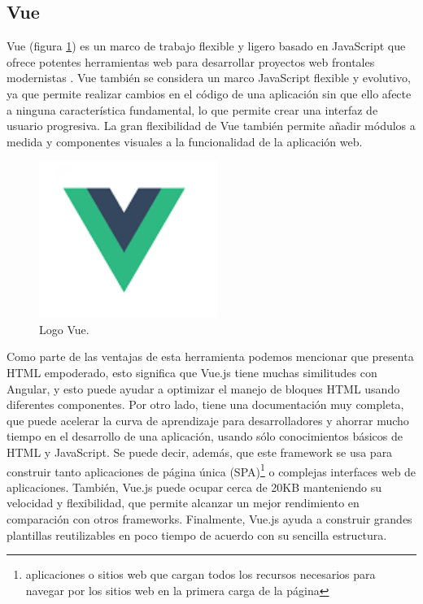 \subsection{Vue}
Vue (figura \ref{vue}) es un marco de trabajo flexible y ligero basado en JavaScript que ofrece potentes herramientas web para desarrollar proyectos web frontales modernistas \cite{vue}. Vue tambi\'en se considera un marco JavaScript flexible y evolutivo, ya que permite realizar cambios en el c\'odigo de una aplicaci\'on sin que ello afecte a ninguna caracter\'istica fundamental, lo que permite crear una interfaz de usuario progresiva. La gran flexibilidad de Vue tambi\'en permite a\~nadir m\'odulos a medida y componentes visuales a la funcionalidad de la aplicaci\'on web.

\begin{figure}
\vspace{-20pt}
\begin{center}
\includegraphics[width=0.52\textwidth]{images/vueLogo.png} 
\end{center} \vspace{-20pt} \caption{Logo Vue.}  \label{vue} \vspace{-10pt} 
\end{figure}

Como parte de las ventajas de esta herramienta podemos mencionar que presenta HTML empoderado, esto significa que Vue.js tiene muchas similitudes con Angular, y esto puede ayudar a optimizar el manejo de bloques HTML usando diferentes componentes. Por otro lado, tiene una documentaci\'on muy completa, que puede acelerar la curva de aprendizaje para desarrolladores y ahorrar mucho tiempo en el desarrollo de una aplicaci\'on, usando s\'olo conocimientos b\'asicos de HTML y JavaScript. Se puede decir, adem\'as, que este framework se usa para construir tanto aplicaciones de p\'agina \'unica (SPA)\footnote{aplicaciones o sitios web que cargan todos los recursos necesarios para navegar por los sitios web en la primera carga de la p\'agina} o complejas interfaces web de aplicaciones. Tambi\'en, Vue.js puede ocupar cerca de 20KB manteniendo su velocidad y flexibilidad, que permite alcanzar un mejor rendimiento en comparaci\'on con otros frameworks. Finalmente, Vue.js ayuda a construir grandes plantillas reutilizables en poco tiempo de acuerdo con su sencilla estructura.

